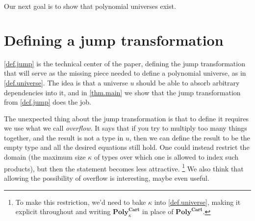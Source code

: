 \documentclass[11pt, one side, article]{memoir}
\theoremstyle{definition}
\theoremstyle{plain}
\newcommand{\Cat}[1]{\mathbf{#1}}%
\newcommand{\poly}{\Cat{Poly}}
\newcommand{\polycart}{\poly^{\Cat{Cart}}}
\newcommand{\0}{\textsf{0}}
\newcommand{\1}{\tn{\textsf{1}}}
\begin{document}
Our next goal is to show that polynomial universes exist.

\section{Defining a jump transformation}\label{sec.jump}

\cref{def.jump} is the technical center of the paper, defining the jump transformation that will serve as the missing piece needed to define a polynomial universe, as in \cref{def.universe}. The idea is that a universe $u$ should be able to absorb arbitrary dependencies into it, and in \cref{thm.main} we show that the jump transformation from \cref{def.jump} does the job.

The unexpected thing about the jump transformation is that to define it requires we use what we call \emph{overflow}. It says that if you try to multiply too many things together, and the result is not a type in $u$, then we can define the result to be the empty type and all the desired equations still hold. One could instead restrict the domain (the maximum size $\kappa$ of types over which one is allowed to index such products), but then the statement becomes less attractive.%
\footnote{To make this restriction, we'd need to bake $\kappa$ into \cref{def.universe}, making it explicit throughout and writing $\polycart_\kappa$ in place of $\polycart$.}
We also think that allowing the possibility of overflow is interesting, maybe even useful.
\end{document}

